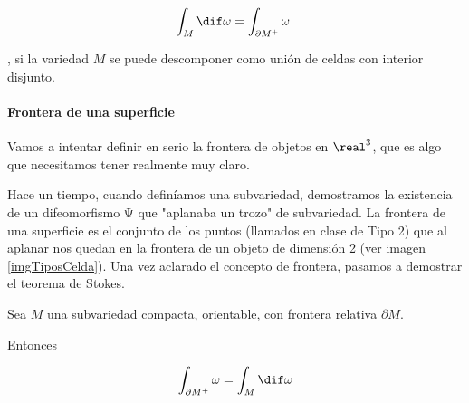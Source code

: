 \begin{theorem}\label{thmStokesCeldas}
\[ \int_M \dif \omega = \int_{\partial  M^+}\omega \]

, si la variedad $M$ se puede descomponer como unión de celdas con interior disjunto.
\end{theorem}

\paragraph{Frontera de una superficie}
Vamos a intentar definir en serio la frontera de objetos en $\real^3$, que es algo que necesitamos tener realmente muy claro.


Hace un tiempo, cuando definíamos una subvariedad, demostramos la existencia de un difeomorfismo Ψ que "aplanaba un trozo" de subvariedad. La frontera de una superficie es el conjunto de los puntos (llamados en clase de Tipo 2) que al aplanar nos quedan en la frontera de un objeto de dimensión 2 (ver imagen \ref{imgTiposCelda}).
Una vez aclarado el concepto de frontera, pasamos a demostrar el teorema de Stokes.


\begin{theorem}
Sea $M$ una subvariedad compacta, orientable, con frontera relativa $\partial  M$.

Entonces

\[\int_{\partial  M^+}\omega = \int_M \dif \omega \]

\end{theorem}

